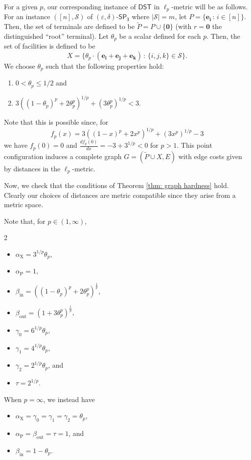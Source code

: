 \documentclass{article}\providecommand{\DeclareRedundantLanguages}[2]{}\usepackage[a4paper,margin=20mm]{geometry}
\newcommand{\1}{\textbf{1}}
\newcommand{\setpT}{$\mathsf{SP_3}$\xspace}
\newcommand{\dst}{$\mathsf{DST}$\xspace}
\newcommand{\td}{\tau}
\newcommand{\pcoord}{\theta_p}
\newcommand{\srd}{\alpha_{\text{X}}}
\newcommand{\trd}{\alpha_{\text{P}}}
\renewcommand{\tilde}{\widetilde}
\begin{document}
For a given $p$, our corresponding instance of  \dst in $\ell_p$-metric will be as follows. For an instance  $([n],\mathcal{S})$ of $(\varepsilon,\delta)$-\setpT where $|\mathcal{S}|=m$, let $P = \{\mathbf{e_i} \,:\, i \in [n] \}$. Then, the set of terminals are defined to be $\tilde{P} = P \cup \{\mathbf{0}\}$ (with $r = \mathbf{0}$ the distinguished ``root'' terminal). Let $\pcoord$ be a scalar defined for each $p$. Then,  the set of facilities is defined to be 
\[
X = \{ \pcoord \cdot (\mathbf{e_i} + \mathbf{e_j} + \mathbf{e_k}) \,:\, \{i,j,k\} \in \mathcal{S} \}.
\]
We choose $\pcoord$ such that the following properties hold:
\begin{enumerate}
    \item $0 < \pcoord \leq 1/2$ and 
    \item $3 ((1-\pcoord)^p + 2\pcoord^p)^{1/p} + (3\pcoord^p)^{1/p} < 3.$
\end{enumerate}
Note that this is possible since, for
\[
f_p(x) = 3 ((1-x)^p + 2x^p)^{1/p} + (3x^p)^{1/p} - 3
\]
we have $f_p(0) = 0$ and $\frac{df_p(0)}{dx} = -3 + 3^{1/p} < 0$ for $p > 1$. This point configuration induces a complete graph $G = (\tilde{P} \cup X, E)$ with edge costs given by distances in the $\ell_p$-metric. 

Now, we check that the conditions of Theorem \ref{thm: graph hardness} hold. Clearly our choices of distances are metric compatible since they arise from a metric space. 
\begin{remark} \label{rmk: l_p distances}
Note that, for $p \in (1, \infty)$,
\begin{multicols}{2}
\begin{itemize}
    \item $\srd= 3^{1/p}\pcoord$,
    \item $\trd= 1$,
    \item $\beta_{\text{in}} = ((1-\pcoord)^p + 2\pcoord^p)^{\frac{1}{p}}$,
    \item $\beta_{\text{out}} = (1 + 3\pcoord^p)^{\frac{1}{p}}$,
    \item $\gamma_0 = 6^{1/p}\pcoord$,
    \item $\gamma_1 = 4^{1/p}\pcoord$,
    \item $\gamma_2 = 2^{1/p} \pcoord$, and 
    \item $\td = 2^{1/p}$.
\end{itemize}
\end{multicols}


When $p = \infty$, we instead have
\begin{itemize}
    \item $\srd = \gamma_0 = \gamma_1 = \gamma_2 = \pcoord$,
    \item $\trd = \beta_{\text{out}} = \td =  1$, and
    \item $\beta_{\text{in}} = 1-\pcoord$.
\end{itemize}
\end{remark}
\end{document}
